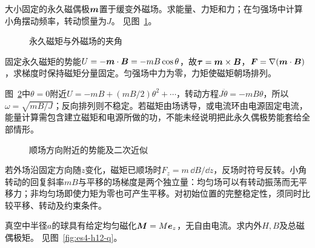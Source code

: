 \begin{exercise}[永久磁偶极的力矩与梯度力]\label{ex:es4-h11}
大小固定的永久磁偶极$\bm{m}$置于缓变外磁场。求能量、力矩和力；在匀强场中计算小角摆动频率，转动惯量为$J$。 见图~\ref{fig:es4-h11-q}。
\end{exercise}

\begin{figure}[H]\centering
{}
\caption{永久磁矩与外磁场的夹角}\label{fig:es4-h11-q}
\end{figure}
\begin{solution}
固定永久磁矩的势能$U=-\bm{m}\cdot\bm{B}=-mB\cos\theta$，故$\bm{\tau}=\bm{m}\times\bm{B}$，$\bm{F}=\nabla(\bm{m}\cdot\bm{B})$，求梯度时保持磁矩分量固定。匀强场中力为零，力矩使磁矩朝场排列。

图~\ref{fig:es4-h11-s}中$\theta=0$附近$U=-mB+(mB/2)\theta^2+\cdots$，转动方程$J\ddot\theta=-mB\theta$，所以$\omega=\sqrt{mB/J}$；反向排列则不稳定。若磁矩由场诱导，或电流环由电源固定电流，能量计算需包含建立磁矩和电源所做的功，不能未经说明把此永久偶极势能套给全部情形。
\begin{figure}[H]\centering
{}
\caption{顺场方向附近的势能及二次近似}\label{fig:es4-h11-s}
\end{figure}


若外场沿固定方向随$z$变化，磁矩已顺场时$F_z=m\,\dd B/\dd z$，反场时符号反转。小角转动的回复斜率$mB$与平移的场梯度是两个独立量：均匀场可以有转动振荡而无平移力；非均匀场即使力矩为零也可产生平移。对初始位置的完整稳定性，须同时比较平移、转动及约束条件。
\end{solution}

\begin{exercise}[均匀磁化球的退磁场]\label{ex:es4-h12}
真空中半径$a$的球具有给定均匀磁化$\bm{M}=M\bm{e}_z$，无自由电流。求内外$H,B$及总磁偶极矩。 见图~\ref{fig:es4-h12-q}。
\end{exercise}

